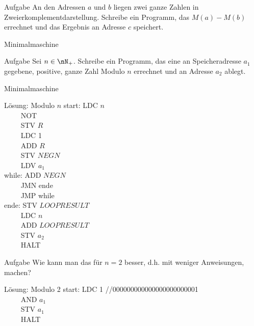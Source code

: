 \begin{frame}{}
	\begin{exampleblock}{Aufgabe}
		An den Adressen $a$ und $b$ liegen zwei ganze Zahlen in Zweierkomplementdarstellung. Schreibe ein Programm, das $M(a)-M(b)$ errechnet und das Ergebnis an Adresse $c$ speichert.
	\end{exampleblock}

\end{frame}

\begin{frame}{Minimalmaschine}
	\begin{exampleblock}{Aufgabe}
		Sei $n \in \nN_+$. Schreibe ein Programm, das eine an Speicheradresse $a_1$ gegebene, positive, ganze Zahl Modulo $n$ errechnet und an Adresse $a_2$ ablegt.
	\end{exampleblock}
\end{frame}

\begin{frame}{Minimalmaschine}
	\begin{block}{Lösung: Modulo $n$}\small
		start: LDC $n$\\
		$\qquad$ NOT\\
		$\qquad$ STV $R$\\
		$\qquad$ LDC 1\\
		$\qquad$ ADD $R$\\
		$\qquad$ STV $NEGN$\\
		$\qquad$ LDV $a_1$ \\
		\medskip
		while:   ADD $NEGN$\\
		$\qquad$ JMN ende\\
		$\qquad$ JMP while\\
		\medskip
		ende:    STV $LOOPRESULT$\\
		$\qquad$ LDC $n$\\
		$\qquad$ ADD $LOOPRESULT$\\
		$\qquad$ STV $a_2$\\
		$\qquad$ HALT\\
	\end{block}
\end{frame}

\begin{frame}{}
	\begin{exampleblock}{Aufgabe}
		Wie kann man das für $n=2$ besser, d.h. mit weniger Anweisungen, machen?
	\end{exampleblock}
\pause
	\begin{block}{Lösung: Modulo 2}
		start:   LDC 1 //000000000000000000000001 \\
		$\qquad$ AND $a_1$ \\
		$\qquad$ STV $a_1$ \\
		$\qquad$ HALT
	\end{block}
\end{frame}


